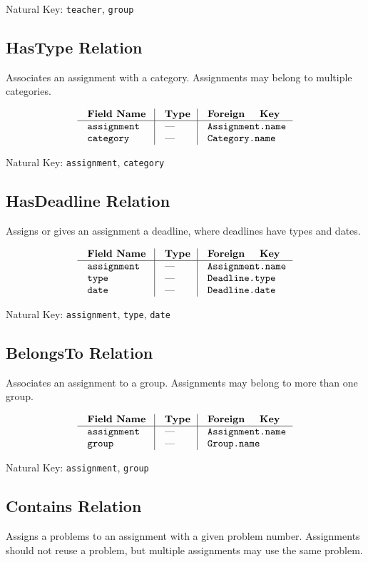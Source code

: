 {\noindent
Natural Key: {\tt teacher}, {\tt group}\par}

\subsection{HasType Relation}
Associates an assignment with a category. 
Assignments may belong to multiple categories.

$$\vbox{
	\offinterlineskip
	\halign{
		\strut \quad {\tt #}	& \vrule\quad #	& \vrule\quad # \cr
		{\bf Field Name}	& {\bf Type}	& {\bf Foreign Key}\cr
		\noalign{\hrule}		
		assignment	& ---	& {\tt Assignment.name} \cr
		category	& ---	& {\tt Category.name} \cr
	}
}$$

{\noindent
Natural Key: {\tt assignment}, {\tt category}\par}

\subsection{HasDeadline Relation}
Assigns or gives an assignment a deadline,
where deadlines have types and dates.

$$\vbox{
	\offinterlineskip
	\halign{
		\strut \quad {\tt #}	& \vrule\quad #	& \vrule\quad # \cr
		{\bf Field Name}	& {\bf Type}	& {\bf Foreign Key}\cr
		\noalign{\hrule}		
		assignment	& ---	& {\tt Assignment.name} \cr
		type	& ---	& {\tt Deadline.type} \cr
		date	& ---	& {\tt Deadline.date} \cr
	}
}$$

{\noindent
Natural Key: {\tt assignment}, {\tt type}, {\tt date}\par}

\subsection{BelongsTo Relation}
Associates an assignment to a group.
Assignments may belong to more than one group.

$$\vbox{
	\offinterlineskip
	\halign{
		\strut \quad {\tt #}	& \vrule\quad #	& \vrule\quad # \cr
		{\bf Field Name}	& {\bf Type}	& {\bf Foreign Key}\cr
		\noalign{\hrule}		
		assignment	& ---	& {\tt Assignment.name} \cr
		group	& ---	& {\tt Group.name} \cr
	}
}$$

{\noindent
Natural Key: {\tt assignment}, {\tt group}\par}

\subsection{Contains Relation}
Assigns a problems to an assignment with a given problem number.
Assignments should not reuse a problem,
but multiple assignments may use the same problem.

